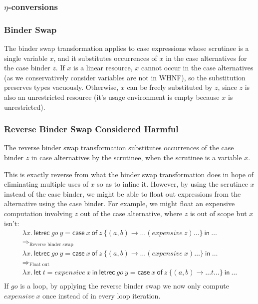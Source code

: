 \documentclass[acmsmall, screen, review]{acmart}
\newcommand{\llet}[2]{\mathsf{let}~#1~\mathsf{in}~#2}
\newcommand{\lletrec}[2]{\mathsf{letrec}~#1~\mathsf{in}~#2}
\newcommand{\ccase}[2]{\mathsf{case}~#1~\mathsf{of}~#2}
\begin{document}


\subsubsection{\texorpdfstring{$\eta$}{Eta}-conversions}



\subsubsection{Binder Swap}

The binder swap transformation applies to case expressions whose scrutinee is a
single variable $x$, and it substitutes occurrences of $x$ in the case
alternatives for the case binder $z$. If $x$ is a linear resource, $x$ cannot
occur in the case alternatives (as we conservatively consider variables are not
in WHNF), so the substitution preserves types vacuously. Otherwise, $x$ can be
freely substituted by $z$, since $z$ is also an unrestricted resource (it's
usage environment is empty because $x$ is unrestricted).



\subsubsection{Reverse Binder Swap Considered Harmful\label{sec:reverse-binder-swap-considered-harmful}}

The reverse binder swap transformation substitutes occurrences of the case
binder $z$ in case alternatives by the scrutinee, when the scrutinee is a
variable $x$.

\ReverseBinderSwapTheorem

\noindent This is exactly reverse from what the binder swap transformation
does in hope of eliminating multiple uses of $x$ so as to inline it. However, by
using the scrutinee $x$ instead of the case binder, we might be able to float
out expressions from the alternative using the case binder. For example, we
might float an expensive computation involving $z$ out of the case alternative,
where $z$ is out of scope but $x$ isn't:
\[
\begin{array}{l}
\lambda x.~\lletrec{go~y = \ccase{x}{z~\{(a,b) \to \dots (expensive~z) \dots\} }}{\dots}\\
\Longrightarrow_\textrm{Reverse binder swap}\\
\lambda x.~\lletrec{go~y = \ccase{x}{z~\{(a,b) \to \dots (expensive~x) \dots\} }}{\dots}\\
\Longrightarrow_\textrm{Float out}\\
\lambda x.~\llet{t = expensive~x}{\lletrec{go~y = \ccase{x}{z~\{(a,b) \to \dots t \dots\} }}{\dots}}\\
\end{array}
\]
If $go$ is a loop, by applying the reverse binder swap we now only compute
$expensive~x$ once instead of in every loop iteration.
\end{document}
